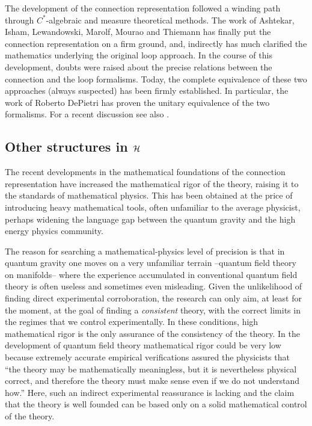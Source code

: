 \documentclass[12pt]{article}
\begin{document}
The development of the connection representation followed a 
winding path through $C^{*}$-algebraic \cite{AshtekarIsham} and 
measure theoretical 
\cite{AshtekarLewandowski,AshtekarLewandowski2,%
AshtekarLewandowski3} methods.  The work of 
Ashtekar, Isham, Lewandowski, Marolf, Mourao and Thiemann has 
finally put the connection representation on a firm ground, and, 
indirectly has much clarified the mathematics underlying the 
original loop approach.  In the course of this development, doubts 
were raised about the precise relations between the connection and 
the loop formalisms.  Today, the complete equivalence of these two 
approaches (always suspected) has been firmly established.  In 
particular, the work of Roberto DePietri \cite{DePietri} has 
proven the unitary equivalence of the two formalisms.  For a 
recent discussion see also \cite{Lewandowski97}.

\subsection{Other structures in $\cal H$} \label{otherstructures}

The recent developments in the mathematical foundations of the 
connection representation have increased the mathematical rigor 
of the theory, raising it to the standards of mathematical 
physics.  This has been obtained at the price of introducing 
heavy mathematical tools, often unfamiliar to the average 
physicist, perhaps widening the language gap between the quantum 
gravity and the high energy physics community. 

The reason for searching a mathematical-physics level of precision is 
that in quantum gravity one moves on a very unfamiliar terrain 
--quantum field theory on manifolds-- where the experience accumulated 
in conventional quantum field theory is often useless and sometimes 
even misleading.  Given the unlikelihood of finding direct 
experimental corroboration, the research can only aim, at least for 
the moment, at the goal of finding a {\em consistent\/} theory, with 
the correct limits in the regimes that we control experimentally.  In 
these conditions, high mathematical rigor is the only assurance of the 
consistency of the theory.  In the development of quantum field theory 
mathematical rigor could be very low because extremely accurate 
empirical verifications assured the physicists that ``the theory may 
be mathematically meaningless, but it is nevertheless physical 
correct, and therefore the theory must make sense even if we do not 
understand how.''  Here, such an indirect experimental reassurance is 
lacking and the claim that the theory is well founded can be based 
only on a solid mathematical control of the theory.
\end{document}
